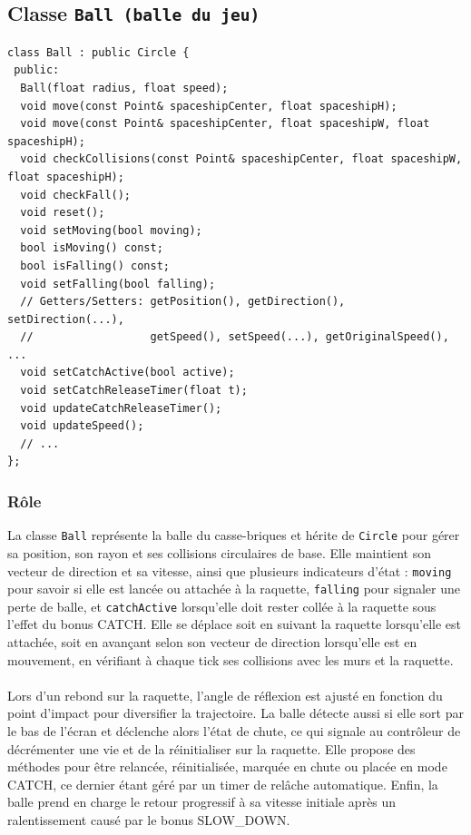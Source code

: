 \documentclass[12pt]{article}
\begin{document}






\subsection{Classe \texttt{Ball (balle du jeu)}}

\begin{lstlisting}
class Ball : public Circle {
 public:
  Ball(float radius, float speed);
  void move(const Point& spaceshipCenter, float spaceshipH);
  void move(const Point& spaceshipCenter, float spaceshipW, float spaceshipH);
  void checkCollisions(const Point& spaceshipCenter, float spaceshipW, float spaceshipH);
  void checkFall();
  void reset();
  void setMoving(bool moving);
  bool isMoving() const;
  bool isFalling() const;
  void setFalling(bool falling);
  // Getters/Setters: getPosition(), getDirection(), setDirection(...),
  //                  getSpeed(), setSpeed(...), getOriginalSpeed(), ...
  void setCatchActive(bool active);
  void setCatchReleaseTimer(float t);
  void updateCatchReleaseTimer();
  void updateSpeed();
  // ...
};

\end{lstlisting}

\subsubsection* {Rôle}

La classe \colorbox{gray!20}{\texttt{Ball}} représente la balle du casse-briques et hérite de \colorbox{gray!20}{\texttt{Circle}} pour gérer sa position, son rayon et ses collisions circulaires de base. Elle maintient son vecteur de direction et sa vitesse, ainsi que plusieurs indicateurs d’état : \colorbox{gray!20}{\texttt{moving}} pour savoir si elle est lancée ou attachée à la raquette, \colorbox{gray!20}{\texttt{falling}} pour signaler une perte de balle, et \colorbox{gray!20}{\texttt{catchActive}} lorsqu’elle doit rester collée à la raquette sous l’effet du bonus CATCH. Elle se déplace soit en suivant la raquette lorsqu’elle est attachée, soit en avançant selon son vecteur de direction lorsqu’elle est en mouvement, en vérifiant à chaque tick ses collisions avec les murs et la raquette. 

\paragraph{}
Lors d’un rebond sur la raquette, l’angle de réflexion est ajusté en fonction du point d’impact pour diversifier la trajectoire. La balle détecte aussi si elle sort par le bas de l’écran et déclenche alors l’état de chute, ce qui signale au contrôleur de décrémenter une vie et de la réinitialiser sur la raquette. Elle propose des méthodes pour être relancée, réinitialisée, marquée en chute ou placée en mode CATCH, ce dernier étant géré par un timer de relâche automatique. Enfin, la balle prend en charge le retour progressif à sa vitesse initiale après un ralentissement causé par le bonus SLOW\_DOWN.
\end{document}
